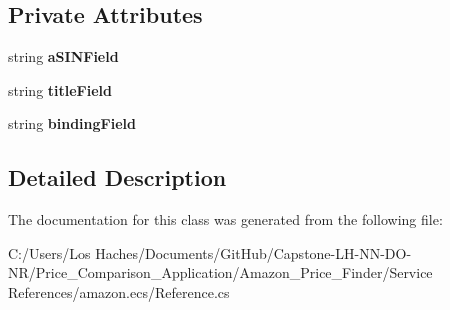 \subsection*{Private Attributes}
\begin{DoxyCompactItemize}
\item 
\hypertarget{class_price___comparison_1_1amazon_1_1ecs_1_1_item_alternate_version_a353af71bb22871cc50448f250f841cfb}{string {\bfseries a\-S\-I\-N\-Field}}\label{class_price___comparison_1_1amazon_1_1ecs_1_1_item_alternate_version_a353af71bb22871cc50448f250f841cfb}

\item 
\hypertarget{class_price___comparison_1_1amazon_1_1ecs_1_1_item_alternate_version_ab60875275f6f4fdc4505a23e40604fce}{string {\bfseries title\-Field}}\label{class_price___comparison_1_1amazon_1_1ecs_1_1_item_alternate_version_ab60875275f6f4fdc4505a23e40604fce}

\item 
\hypertarget{class_price___comparison_1_1amazon_1_1ecs_1_1_item_alternate_version_a170578d6ffb1b8b6e24ac6c918432895}{string {\bfseries binding\-Field}}\label{class_price___comparison_1_1amazon_1_1ecs_1_1_item_alternate_version_a170578d6ffb1b8b6e24ac6c918432895}

\end{DoxyCompactItemize}


\subsection{Detailed Description}


The documentation for this class was generated from the following file\-:\begin{DoxyCompactItemize}
\item 
C\-:/\-Users/\-Los Haches/\-Documents/\-Git\-Hub/\-Capstone-\/\-L\-H-\/\-N\-N-\/\-D\-O-\/\-N\-R/\-Price\-\_\-\-Comparison\-\_\-\-Application/\-Amazon\-\_\-\-Price\-\_\-\-Finder/\-Service References/amazon.\-ecs/Reference.\-cs\end{DoxyCompactItemize}

